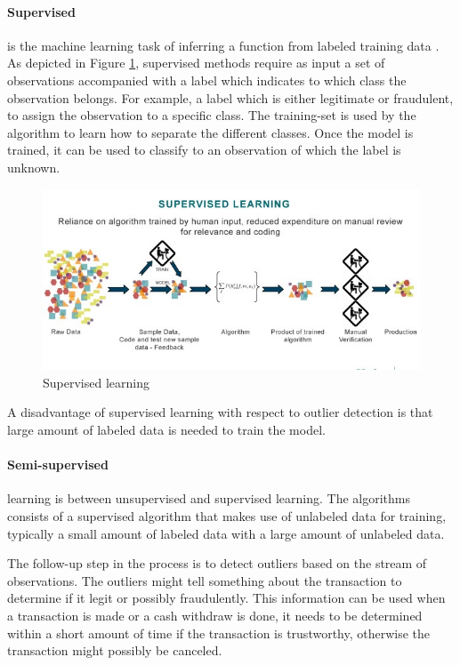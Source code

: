 \paragraph{Supervised} is the machine learning task of inferring a function from labeled training data \cite{9780262018258}. As depicted in Figure \ref{fig:supervised}, supervised methods require as input a set of observations accompanied with a label which indicates to which class the observation belongs. For example, a label which is either legitimate or fraudulent, to assign the observation to a specific class. The training-set is used by the algorithm to learn how to separate the different classes. Once the model is trained, it can be used to classify to an observation of which the label is unknown.
\begin{figure}[ht!]
\centering
\includegraphics[width=\textwidth]{figures/supervised.jpg}
\caption{Supervised learning}
\label{fig:supervised}
\end{figure}
A disadvantage of supervised learning with respect to outlier detection is that large amount of labeled data is needed to train the model. 

\paragraph{Semi-supervised} learning is between unsupervised and supervised learning. The algorithms consists of a supervised algorithm that makes use of unlabeled data for training, typically a small amount of labeled data with a large amount of unlabeled data.

The follow-up step in the process is to detect outliers based on the stream of observations. The outliers might tell something about the transaction to determine if it legit or possibly fraudulently. This information can be used when a transaction is made or a cash withdraw is done, it needs to be determined within a short amount of time if the transaction is trustworthy, otherwise the transaction might possibly be canceled.

